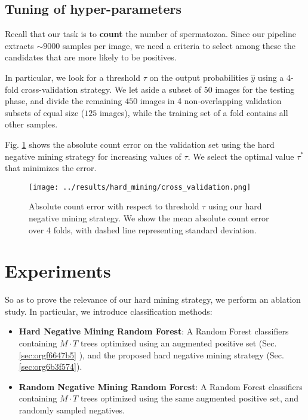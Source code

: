 \documentclass[11pt]{article}
\begin{document}
\subsection{Tuning of hyper-parameters}
\label{sec:org8d9bd5e}

Recall that our task is to \textbf{count} the number of spermatozoa.
Since our pipeline extracts \(\sim 9000\) samples per image, we need a criteria to select among these the
candidates that are more likely to be positives.

In particular, we look for a threshold \(\tau\) on the output probabilities \(\hat{y}\)
using a 4-fold cross-validation strategy.
We let aside a subset of \(50\) images for the testing phase, and divide the remaining \(450\)
images in 4 non-overlapping validation subsets of equal size (\(125\) images), while
the training set of a fold contains all other samples.

Fig. \ref{fig:orgd59f3c4} shows the absolute count error on the validation set using the hard negative mining strategy
for increasing values of \(\tau\).
We select the optimal value \(\tau^*\) that minimizes the error.

\begin{figure}[htbp]
\centering
\texttt{[image: ../results/hard\_mining/cross\_validation.png]}
\caption{\label{fig:orgd59f3c4}Absolute count error with respect to threshold \(\tau\) using our hard negative mining strategy. We show the mean absolute count error over 4 folds, with dashed line representing standard deviation.}
\end{figure}

\section{Experiments}
\label{sec:org852a0e8}

So as to prove the relevance of our hard mining strategy, we perform an ablation study.
In particular, we introduce classification methods:

\begin{itemize}
\item \textbf{Hard Negative Mining Random Forest}: A Random Forest classifiers containing \(M \cdot T\) trees
optimized using an augmented positive set (Sec. \ref{sec:orgf6647b5} ), and the proposed hard negative mining strategy (Sec. \ref{sec:org6b3f574}).
\item \textbf{Random Negative Mining Random Forest}: A Random Forest classifiers containing \(M \cdot T\) trees
optimized using the same augmented positive set, and randomly sampled negatives.
\end{itemize}
\end{document}
